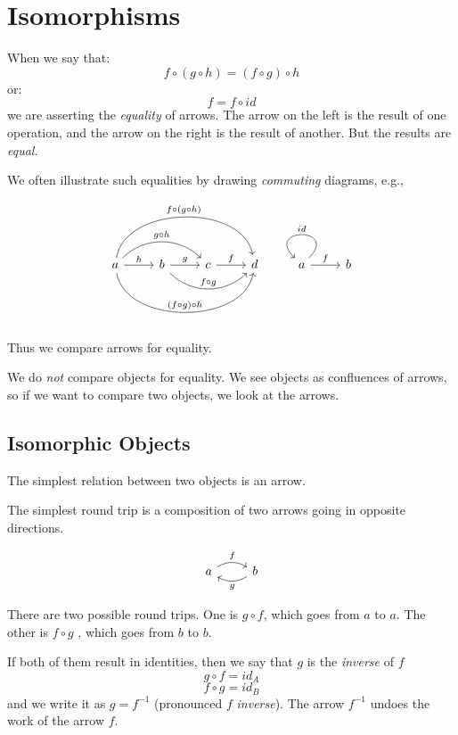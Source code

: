 \documentclass[DaoFP]{subfiles}
\begin{document}
\setcounter{chapter}{2}


\chapter{Isomorphisms}

When we say that:
\[f \circ (g \circ h) = (f \circ g) \circ h \]
or:
\[ f = f \circ id \]
we are asserting the \emph{equality} of arrows. The arrow on the left is the result of one operation, and the arrow on the right is the result of another. But the results are \emph{equal}.

We often illustrate such equalities by drawing \emph{commuting} diagrams, e.g.,

\[
 \begin{tikzcd}
 a
 \arrow[r, "h"]
 \arrow[rr, bend left=45, "g \circ h"]
 \arrow[rrr, bend left=80, "f \circ (g \circ h)"]
 \arrow[rrr, bend right=80, "(f \circ g) \circ h"]
 & b
 \arrow[r, "g"]
 \arrow[rr, bend right=45, "f \circ g"]
 &c
 \arrow[r, "f"]
 &d
 \end{tikzcd}
 \begin{tikzcd}
 a
 \arrow[r, "f"]
 \arrow[r, loop, "id"']
 &b
 \end{tikzcd}
\]

Thus we compare arrows for equality.

We do \emph{not} compare objects for equality. We see objects as confluences of arrows, so if we want to compare two objects, we look at the arrows.

\section{Isomorphic Objects}

The simplest relation between two objects is an arrow.

The simplest round trip is a composition of two arrows going in opposite directions. 

\[
 \begin{tikzcd}
 a
 \arrow[r, bend left, "f"]
 & b
 \arrow[l, bend left, "g"]
 \end{tikzcd}
\]

There are two possible round trips. One is $g \circ f$, which goes from $a$ to $a$. The other is $f \circ g$ , which goes from $b$ to $b$.

If both of them result in identities, then we say that $g$ is the \emph{inverse} of $f$
\[ g \circ f = id_A\]
\[f \circ g = id_B\]
and we write it as $g = f^{-1}$ (pronounced $f$ \emph{inverse}). The arrow $ f^{-1}$ undoes the work of the arrow $f$. 
\end{document}
